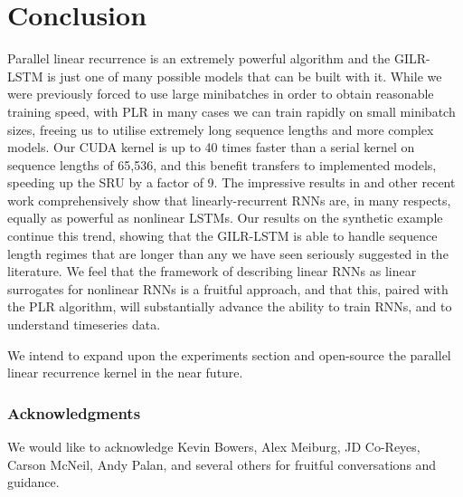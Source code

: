 \documentclass{article}
\begin{document}
\section{Conclusion}
Parallel linear recurrence is an extremely powerful algorithm and the GILR-LSTM
is just one of many possible models that can be built with it. While we were
previously forced to use large minibatches in order to obtain reasonable
training speed, with PLR in many cases we can train rapidly on small minibatch
sizes, freeing us to utilise extremely long sequence lengths and more complex
models. Our CUDA kernel is up to 40 times faster than a serial kernel on
sequence lengths of 65,536, and this benefit transfers to implemented models,
speeding up the SRU \cite{lei2017} by a factor of 9. The impressive results in
\cite{lei2017} and other recent work comprehensively show that
linearly-recurrent RNNs are, in many respects, equally as powerful as nonlinear
LSTMs. Our results on the synthetic example continue this trend, showing that
the GILR-LSTM is able to handle sequence length regimes that are longer than any
we have seen seriously suggested in the literature. We feel that the framework
of describing linear RNNs as linear surrogates for nonlinear RNNs is a fruitful
approach, and that this, paired with the PLR algorithm, will substantially
advance the ability to train RNNs, and to understand timeseries data. 



We intend to expand upon the experiments section and open-source the parallel
linear recurrence kernel in the near future.

\subsubsection*{Acknowledgments}
We would like to acknowledge Kevin Bowers, Alex Meiburg, JD Co-Reyes, Carson
McNeil, Andy Palan, and several others for fruitful conversations and guidance.
\end{document}
